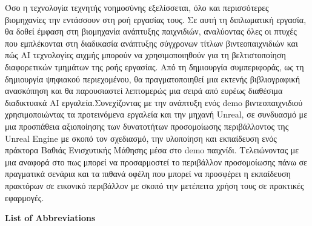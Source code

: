 \documentclass[a4paper,one side,12pt]{book}
\newcommand\blankpage{%
    \null
    \thispagestyle{empty}%
    \addtocounter{page}{-1}%
    \newpage}
\begin{document}
 Όσο η τεχνολογία τεχνητής νοημοσύνης εξελίσσεται, όλο και περισσότερες βιομηχανίες την εντάσσουν στη ροή εργασίας τους. Σε αυτή τη διπλωματική εργασία, θα δοθεί έμφαση στη βιομηχανία ανάπτυξης παιχνιδιών, αναλύοντας όλες οι πτυχές που εμπλέκονται στη διαδικασία ανάπτυξης σύγχρονων τίτλων βιντεοπαιχνιδιών και πώς ΑΙ τεχνολογίες αιχμής μπορούν να χρησιμοποιηθούν για τη βελτιστοποίηση διαφορετικών τμημάτων της ροής εργασίας. Από τη δημιουργία συμπεριφοράς, ως τη δημιουργία ψηφιακού περιεχομένου, θα πραγματοποιηθεί μια εκτενής βιβλιογραφική ανασκόπηση και θα παρουσιαστεί λεπτομερώς μια σειρά από ευρέως διαθέσιμα διαδικτυακά ΑΙ εργαλεία.Συνεχίζοντας με την ανάπτυξη ενός demo βιντεοπαιχνιδιού  χρησιμοποιώντας τα προτεινόμενα εργαλεία και την μηχανή Unreal, σε συνδυασμό με μια προσπάθεια αξιοποίησης των δυνατοτήτων προσομοίωσης περιβάλλοντος της  Unreal Engine με σκοπό τον σχεδιασμό, την υλοποίηση και εκπαίδευση ενός πράκτορα Βαθιάς Ενισχυτικής Μάθησης μέσα στο  demo παιχνίδι. Τελειώνοντας με μια αναφορά στο πως μπορεί να προσαρμοστεί το περιβάλλον προσομοίωσης πάνω σε πραγματικά σενάρια και τα πιθανά οφέλη που μπορεί να προσφέρει η εκπαίδευση πρακτόρων σε εικονικό περιβάλλον με σκοπό την μετέπειτα χρήση τους σε πρακτικές εφαρμογές.
\blankpage

\tableofcontents

\thispagestyle{empty}
\listoffigures
\listoftables
\pagebreak

\begin{center}
  \centering
  \normalfont\bfseries\Huge\color{myBlue}List of Abbreviations
\end{center}
\vspace{-1.5em}
\noindent\makebox[\linewidth]{\textcolor{myBlue}{\rule{\linewidth}{1pt}}}
\end{document}

